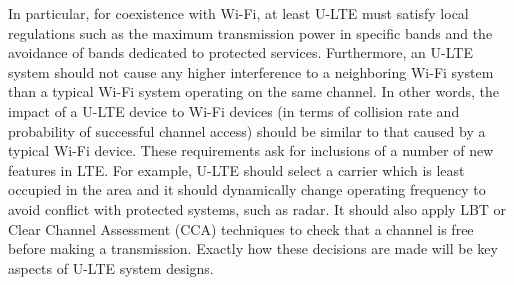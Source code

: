 In particular, for coexistence with Wi-Fi, at least U-LTE must satisfy local regulations such as the maximum transmission power in specific bands and the avoidance of bands dedicated to protected services. Furthermore, an U-LTE system should not cause any higher interference to a neighboring Wi-Fi system than a typical Wi-Fi system operating on the same channel. In other words, the impact of a U-LTE device to Wi-Fi devices (in terms of collision rate and probability of successful channel access) should be similar to that caused by a typical Wi-Fi device. These requirements ask for inclusions of a number of new features in LTE. For example, U-LTE should select a carrier which is least occupied in the area and it should dynamically change operating frequency to avoid conflict with protected systems, such as radar. It should also apply LBT or Clear Channel Assessment (CCA) techniques to check that a channel is free before making a transmission. Exactly how these decisions are made will be key aspects of U-LTE system designs.

